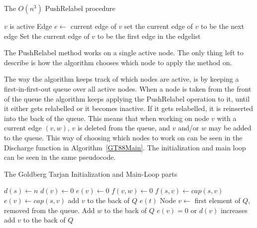 \begin{algorithm}
	\caption{The $O(n^3)$ PushRelabel procedure}\label{GT88GenericPushRelabel}
\begin{algorithmic}[1]
\Statex
\Require $v$ is active
	\State Edge $e \gets$ current edge of $v$
		\State {}
	\Else
			\State set the current edge of $v$ to be the next edge
		\Else
			\State Set the current edge of $v$ to be the first edge in the edgelist
			\State {}
		\EndIf
	\EndIf
\EndProcedure
\end{algorithmic}
\end{algorithm}

The PushRelabel method works on a single active node. The only thing left to describe is how the algorithm chooses which node to apply the method on.

The way the algorithm keeps track of which nodes are active, is by keeping a first-in-first-out queue over all active nodes. When a node
is taken from the front of the queue the algorithm keeps applying the PushRelabel operation to it, until it either gets relabelled or it becomes inactive.
If it gets relabelled, it is reinserted into the back of the queue.
This means that when working on node $v$ with a current edge $(v,w)$, $v$ is deleted from the queue, and $v$ and/or $w$ may be added to the
queue. This way of choosing which nodes to work on can be seen in the Discharge function in Algorithm~\ref{GT88Main}. The
initialization and main loop can be seen in the same pseudocode.

\begin{algorithm}
	\caption{The Goldberg Tarjan Initialization and Main-Loop parts}\label{GT88Main}
\begin{algorithmic}[1]
\Statex
{}
	\State $d(s) \gets n$ \label{GTInitBegins}
		\State $d(v) \gets 0$
		\State $e(v) \gets 0$
	\EndFor
		\State $f(v,w) \gets 0$
	\EndFor
		\State $f(s,v) \gets cap(s,v)$
		\State $e(v) \gets cap(s,v)$
		\State add $v$ to the back of $Q$
	\EndFor \label{GTInitEnds}
		\State {}
	\EndWhile
	\State \Return $e(t)$
\EndFunction
\Statex
{}
	\State Node $v \gets$ first element of $Q$, removed from the queue.
	\Repeat
		\State {}
			\State Add $w$ to the back of $Q$
		\EndIf
	\Until $e(v) = 0 $ or $d(v) $ increases
		\State add $v$ to the back of $Q$
	\EndIf
\EndProcedure
\end{algorithmic}
\end{algorithm}
\clearpage

